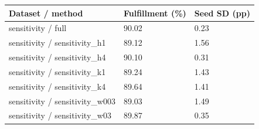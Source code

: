 \begin{tabular}{lll}
\toprule
Dataset / method & Fulfillment (\%) & Seed SD (pp)\\
\midrule
sensitivity / full & 90.02 & 0.23\\
sensitivity / sensitivity\_h1 & 89.12 & 1.56\\
sensitivity / sensitivity\_h4 & 90.10 & 0.31\\
sensitivity / sensitivity\_k1 & 89.24 & 1.43\\
sensitivity / sensitivity\_k4 & 89.64 & 1.41\\
sensitivity / sensitivity\_w003 & 89.03 & 1.49\\
sensitivity / sensitivity\_w03 & 89.87 & 0.35\\
\bottomrule
\end{tabular}